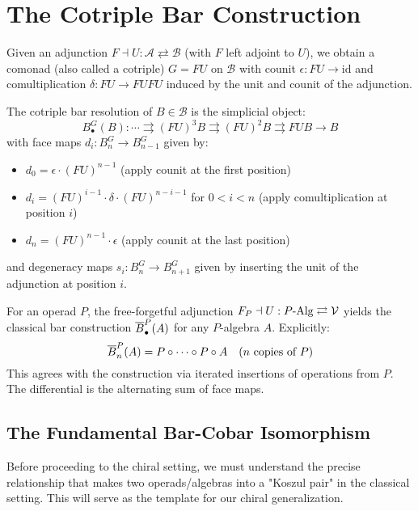 \section{The Cotriple Bar Construction}
 
Given an adjunction $F \dashv U : \mathcal{A} \rightleftarrows \mathcal{B}$ (with $F$ left adjoint to $U$), we obtain a comonad (also called a cotriple) $G = FU$ on $\mathcal{B}$ with counit $\epsilon : FU \to \text{id}$ and comultiplication $\delta : FU \to FUFU$ induced by the unit and counit of the adjunction.
 
\begin{definition}
The cotriple bar resolution of $B \in \mathcal{B}$ is the simplicial object:
\[
B^G_\bullet(B) : \cdots \rightrightarrows (FU)^3B \rightrightarrows (FU)^2B \rightrightarrows FUB \to B
\]
with face maps $d_i : B^G_n \to B^G_{n-1}$ given by:
\begin{itemize}
\item $d_0 = \epsilon \cdot (FU)^{n-1}$ (apply counit at the first position)
\item $d_i = (FU)^{i-1} \cdot \delta \cdot (FU)^{n-i-1}$ for $0 < i < n$ (apply comultiplication at position $i$)  
\item $d_n = (FU)^{n-1} \cdot \epsilon$ (apply counit at the last position)
\end{itemize}
and degeneracy maps $s_i : B^G_n \to B^G_{n+1}$ given by inserting the unit of the adjunction at position $i$.
\end{definition}
 
\begin{example}
For an operad $P$, the free-forgetful adjunction $F_P \dashv U : P\text{-Alg} \rightleftarrows \mathcal{V}$ yields the classical bar construction $\overline{B}^P_\bullet(A)$ for any $P$-algebra $A$. Explicitly:
\[
\overline{B}^P_n(A) = P \circ \cdots \circ P \circ A \quad \text{($n$ copies of $P$)}
\]
This agrees with the construction via iterated insertions of operations from $P$. The differential is the alternating sum of face maps.
\end{example}
 
\subsection{The Fundamental Bar-Cobar Isomorphism}

Before proceeding to the chiral setting, we must understand the precise relationship that makes two operads/algebras into a "Koszul pair" in the classical setting. This will serve as the template for our chiral generalization.

